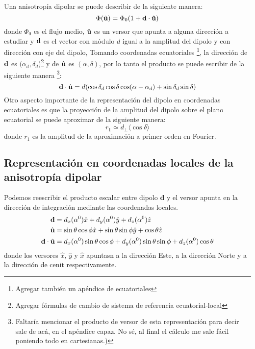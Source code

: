 Una anisotropía dipolar se puede describir de la siguiente manera:
\begin{equation}
    \Phi(\hat{\bf{u}}) = \Phi_0(1+\bf{d}\cdot\hat{\bf{u}})
    \label{eq:dipolo_general}
\end{equation}
\noindent donde $\Phi_0$ es el flujo medio, $\hat{\bf{u}}$ es un versor que apunta a alguna dirección a estudiar y $\bf{d}$ es el vector con módulo $d$ igual a la amplitud del dipolo y  con dirección  con eje del dipolo, Tomando coordenadas ecuatoriales \footnote{Agregar también un apéndice de ecuatoriales}, la dirección de $\bf{d}$ es $(\alpha_d, \delta_d$)\footnote{Agregar fórmulas de cambio de sistema de referencia ecuatorial-local} y  de $\hat{\bf{u}}$ es $(\alpha, \delta)$, por lo tanto  el producto se puede escribir de la siguiente manera \footnote{Faltaría mencionar el producto de versor de esta representación para decir sale de acá, en el apéndice capaz. No sé, al final el cálculo me  sale fácil poniendo  todo en cartesianas.)}:
\begin{equation*}
    \textbf{d}\cdot\hat{\bf{u}}= d (\cos\delta_d \cos\delta \cos(\alpha - \alpha_d) + \sin\delta_d  \sin\delta)
    \label{eq:product_ud}
\end{equation*}
Otro aspecto importante de la representación del dipolo en coordenadas ecuatoriales es que la proyección de la amplitud del dipolo sobre el plano ecuatorial se puede aproximar de la siguiente manera:
\begin{equation}
    r_1 \simeq d_\perp \langle \cos\delta \rangle
    \label{eq:fourier_perp}
\end{equation}
donde $r_1$ es la amplitud de la aproximación a primer orden en Fourier.

\subsection{Representación en coordenadas locales de la anisotropía dipolar}
Podemos reescribir el producto escalar entre dipolo $\textbf{d}$ y el versor apunta en la dirección de integración mediante las coordenadas locales.
\begin{align*}
    \textbf{d} &=  d_x(\alpha^0)\hat{x} +  d_y(\alpha^0)\hat{y}+ d_z(\alpha^0)\hat{z} \\
    \hat{\bf{u}} &=\sin\theta \cos\phi \hat{x} + \sin\theta \sin\phi \hat{y} + \cos\theta\hat{z}\\
    \textbf{d}\cdot\hat{\bf{u}} &= d_x(\alpha^0)\sin\theta \cos\phi
    + d_y(\alpha^0) \sin\theta \sin\phi  
     + d_z(\alpha^0)\cos\theta
\end{align*}
donde los versores $\hat{x}$, $\hat{y}$ y $\hat{x}$ apuntasn a la dirección Este, a la dirección Norte  y a la dirección de cenit respectivamente.


